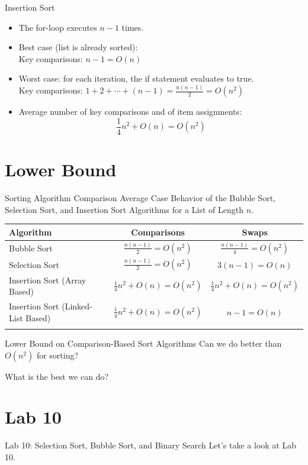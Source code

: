 \documentclass[14pt,aspectratio=1610]{beamer}
\begin{document}
\begin{frame}{Insertion Sort}
  \begin{itemize}
    \item
      The for-loop executes $n - 1$ times.
    \item
      Best case (list is already sorted):\\
      Key comparisons: $n - 1 = O(n)$
    \item 
      Worst case: for each iteration, the if statement evaluates to true.\\
      Key comparisons: $1 + 2 + \cdots + (n - 1) = \frac{n(n - 1)}{2} = O(n^2)$
    \item 
      Average number of key comparisons and of item assignments:
      \begin{equation*}
        \frac{1}{4} n^2 + O(n) = O(n^2)
      \end{equation*}
    \end{itemize}
\end{frame}

\section{Lower Bound}

\begin{frame}{Sorting Algorithm Comparison}
\center{}
{\small Average Case Behavior of the Bubble Sort, Selection Sort, and Insertion Sort Algorithms for a List of Length $n$.}

{\small%
\begin{tabularx}{\textwidth}{Xcc}
\toprule{}
  \textbf{Algorithm} & \textbf{Comparisons} & \textbf{Swaps}\\
\midrule{}
Bubble Sort & $\frac{n(n-1)}{2} = O(n^2)$ & $\frac{n(n-1)}{4} = O(n^2)$ \\[1.3ex]
Selection Sort & $\frac{n(n-1)}{2} = O(n^2)$ & $3(n - 1) = O(n)$ \\[1.3ex]
Insertion Sort (Array Based) & $\frac{1}{4}n^2 + O(n) = O(n^2)$ & $\frac{1}{4}n^2 + O(n) = O(n^2)$ \\[1.3ex]
Insertion Sort (Linked-List Based) & $\frac{1}{4}n^2 + O(n) = O(n^2)$ & $n - 1 = O(n)$ \\
\bottomrule{}
\end{tabularx}%
}
\end{frame}

\begin{frame}{\large{Lower Bound on Comparison-Based Sort Algorithms}}
\center\Large
Can we do better than \(O(n^2)\) for sorting?\vspace{1em}

What is the best we can do?
\end{frame}

\section*{Lab 10}
\begin{frame}{\large{Lab 10: Selection Sort, Bubble Sort, and Binary Search}}
\centering\Large
  Let's take a look at Lab 10.
\end{frame}
\end{document}
